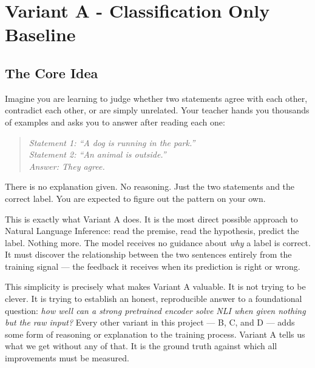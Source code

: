 

\renewcommand\footnotetextcopyrightpermission[1]{}
\pagestyle{plain}

\section{Variant A - Classification Only Baseline}

\subsection{The Core Idea}

Imagine you are learning to judge whether two statements agree with
each other, contradict each other, or are simply unrelated. Your
teacher hands you thousands of examples and asks you to answer after
reading each one:

\begin{quote}
\textit{Statement 1: ``A dog is running in the park.''} \\
\textit{Statement 2: ``An animal is outside.''} \\
\textit{Answer: They agree.}
\end{quote}

There is no explanation given. No reasoning. Just the two statements
and the correct label. You are expected to figure out the pattern on
your own.

This is exactly what Variant A does. It is the most direct possible
approach to Natural Language Inference: read the premise, read the
hypothesis, predict the label. Nothing more. The model receives no
guidance about \textit{why} a label is correct. It must discover the
relationship between the two sentences entirely from the training
signal --- the feedback it receives when its prediction is right or
wrong.

This simplicity is precisely what makes Variant A valuable. It is not
trying to be clever. It is trying to establish an honest, reproducible
answer to a foundational question: \textit{how well can a strong
pretrained encoder solve NLI when given nothing but the raw input?}
Every other variant in this project --- B, C, and D --- adds some form
of reasoning or explanation to the training process. Variant A tells us
what we get without any of that. It is the ground truth against which
all improvements must be measured.

